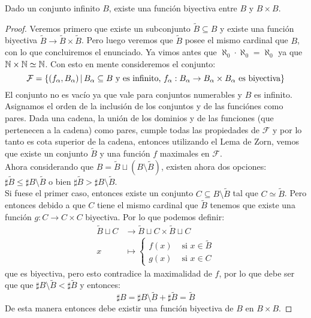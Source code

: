 \documentclass[12pt,a4paper]{book}
\begin{document}
\begin{lem}
Dado un conjunto infinito $B$, existe una función biyectiva entre $B$ y $ B \times B$.
\begin{proof}
Veremos primero que existe un subconjunto $\tilde{B} \subseteq B$ y existe una función biyectiva $\tilde{B} \rightarrow \tilde{B} \times \tilde{B}$. Pero luego veremos que $\tilde{B}$ posee el mismo cardinal que $B$, con lo que concluiremos el enunciado.
Ya vimos antes que $\aleph_0 \cdot \aleph_0 = \aleph _0$ ya que $\mathbb{N} \times \mathbb{N} \simeq \mathbb{N}$. Con esto en mente consideremos el conjunto:
$$ \mathcal{F} = \{ (f_{\alpha},B_{\alpha})\,\vert\, B_{\alpha} \subseteq B \mbox{ y es infinito, } f_{\alpha} : B_{\alpha} \rightarrow B_{\alpha} \times B_{\alpha} \mbox{ es biyectiva} \}$$
El conjunto no es vacío ya que vale para conjuntos numerables y $B$ es infinito.\\
Asignamos el orden de la inclusión de los conjuntos y de las funciónes como pares. Dada una cadena, la unión de los dominios y de las funciones (que pertenecen a la cadena) como pares, cumple todas las propiedades de $\mathcal{F}$ y por lo tanto es cota superior de la cadena, entonces utilizando el Lema de Zorn, vemos que existe un conjunto $\tilde{B}$ y una función $f$ maximales en $\mathcal{F}$.\\
Ahora considerando que $B = \tilde{B} \sqcup ( B \setminus \tilde{B})$, existen ahora dos opciones: $\sharp \tilde{B} \leq \sharp B \setminus \tilde{B}$ o bien $\sharp \tilde{B} > \sharp B \setminus \tilde{B}$.\\
Si fuese el primer caso, entonces existe un conjunto $ C \subseteq B \setminus \tilde{B}$ tal que $ C \simeq \tilde{B}$. Pero entonces debido a que $C$ tiene el mismo cardinal que $\tilde{B}$ tenemos que existe una función $g:C \rightarrow C \times C$ biyectiva. Por lo que podemos definir:
\begin{align*}
\tilde{B} \sqcup C &\longrightarrow \tilde{B} \sqcup C \times \tilde{B} \sqcup C \\
x &\longmapsto \begin{cases} f(x) &\mbox{ si } x \in \tilde{B} \\ g(x) &\mbox{ si } x \in C \end{cases}
\end{align*}
que es biyectiva, pero esto contradice la maximalidad de $f$, por lo que debe ser que que $ \sharp B \setminus \tilde{ B}  < \sharp \tilde{B}$ y entonces:
$$ \sharp B = \sharp B \setminus \tilde{B} + \sharp \tilde{B} = \tilde{B}$$
De esta manera entonces debe existir una función biyectiva de $B$ en $B \times B$.
\end{proof}
\end{lem}
\end{document}
